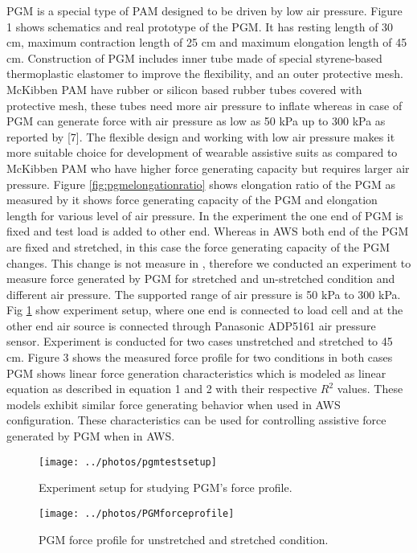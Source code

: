 \documentclass[letterpaper, 10 pt, conference]{ieeeconf}  %
\begin{document}
PGM is a special type of PAM designed to be driven by low air pressure. Figure 1 shows schematics and real prototype of the PGM. It has resting length of 30 cm, maximum contraction length of 25 cm and maximum elongation length of 45 cm. Construction of PGM includes inner tube made of special styrene-based thermoplastic elastomer to improve the flexibility, and an outer protective mesh. McKibben PAM have rubber or silicon based rubber tubes covered with protective mesh, these tubes need more air pressure to inflate whereas in case of PGM can generate force with air pressure as low as 50 kPa up to 300 kPa as reported by [7]. The flexible design and working with low air pressure makes it more suitable choice for development of wearable assistive suits as compared to McKibben PAM who have higher force generating capacity but requires larger air pressure. Figure \ref{fig:pgmelongationratio} shows elongation ratio of the PGM as measured by \cite{7} it shows force generating capacity of the PGM and elongation length for various level of air pressure. In the experiment the one end of PGM is fixed and test load is added to other end. Whereas in AWS both end of the PGM are fixed and stretched, in this case the force generating capacity of the PGM changes. This change is not measure in \cite{7}, therefore we conducted an experiment to measure force generated by PGM for stretched and un-stretched condition and different air pressure. The supported range of air pressure is 50 kPa to 300 kPa. Fig \ref{fig:pgmtest} show experiment setup, where one end is connected to load cell and at the other end air source is connected through Panasonic ADP5161 air pressure sensor. Experiment is conducted for two cases unstretched and stretched to 45 cm. Figure 3 shows the measured force profile for two conditions in both cases PGM shows linear force generation characteristics which is modeled as linear equation as described in equation 1 and 2 with their respective $R^2$ values. These models exhibit similar force generating behavior when used in AWS configuration. These characteristics can be used for controlling assistive force generated by PGM when in AWS.

\begin{figure}
	\centering
	\texttt{[image: ../photos/pgmtestsetup]}
	\caption{Experiment setup for studying PGM's force profile.}
	\label{fig:pgmtest}
\end{figure}

\begin{figure}
	\centering
	\texttt{[image: ../photos/PGMforceprofile]}
	\caption{PGM force profile for unstretched and stretched condition.}
	\label{fig:pgmforceprofile}
\end{figure}
\end{document}
